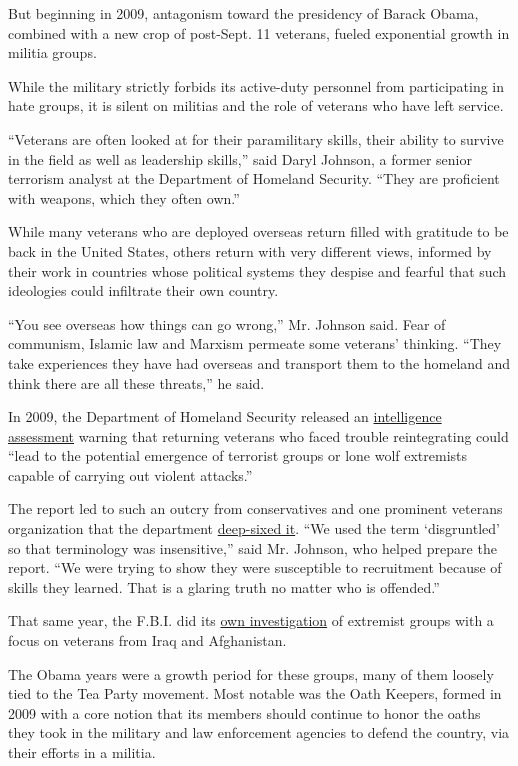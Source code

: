 But beginning in 2009, antagonism toward the presidency of Barack Obama,
combined with a new crop of post-Sept. 11 veterans, fueled exponential
growth in militia groups.

While the military strictly forbids its active-duty personnel from
participating in hate groups, it is silent on militias and the role of
veterans who have left service.

``Veterans are often looked at for their paramilitary skills, their
ability to survive in the field as well as leadership skills,'' said
Daryl Johnson, a former senior terrorism analyst at the Department of
Homeland Security. ``They are proficient with weapons, which they often
own.''

While many veterans who are deployed overseas return filled with
gratitude to be back in the United States, others return with very
different views, informed by their work in countries whose political
systems they despise and fearful that such ideologies could infiltrate
their own country.

``You see overseas how things can go wrong,'' Mr. Johnson said. Fear of
communism, Islamic law and Marxism permeate some veterans' thinking.
``They take experiences they have had overseas and transport them to the
homeland and think there are all these threats,'' he said.

In 2009, the Department of Homeland Security released an
\href{https://fas.org/irp/eprint/rightwing.pdf}{intelligence assessment}
warning that returning veterans who faced trouble reintegrating could
``lead to the potential emergence of terrorist groups or lone wolf
extremists capable of carrying out violent attacks.''

The report led to such an outcry from conservatives and one prominent
veterans organization that the department
\href{https://thecaucus.blogs.nytimes3xbfgragh.onion/2009/04/16/extremist-report-draws-criticism-prompts-apology/}{deep-sixed
it}. ``We used the term `disgruntled' so that terminology was
insensitive,'' said Mr. Johnson, who helped prepare the report. ``We
were trying to show they were susceptible to recruitment because of
skills they learned. That is a glaring truth no matter who is
offended.''

That same year, the F.B.I. did its
\href{https://www.wsj.com/articles/SB123992665198727459}{own
investigation} of extremist groups with a focus on veterans from Iraq
and Afghanistan.

The Obama years were a growth period for these groups, many of them
loosely tied to the Tea Party movement. Most notable was the Oath
Keepers, formed in 2009 with a core notion that its members should
continue to honor the oaths they took in the military and law
enforcement agencies to defend the country, via their efforts in a
militia.

